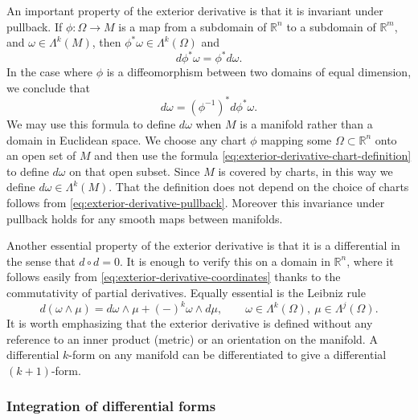{An important property of the exterior derivative is that it is invariant under pullback. If $\phi:\Omega\to M$ is a map from a subdomain of $\mathbb R^n$ to a subdomain of $\mathbb R^m$, and $\omega\in\Lambda^k(M)$, then $\phi^*\omega\in\Lambda^k(\Omega)$ and}
\begin{equation}\label{eq:exterior-derivative-pullback}
d\phi^*\omega=\phi^*d\omega.
\end{equation}
{In the case where $\phi$ is a diffeomorphism between two domains of equal dimension, we conclude that}
\begin{equation}\label{eq:exterior-derivative-chart-definition}
d\omega=(\phi^{-1})^*d\phi^*\omega.
\end{equation}
{We may use this formula to define $d\omega$ when $M$ is a manifold rather than a domain in Euclidean space. We choose any chart $\phi$ mapping some $\Omega\subset\mathbb R^n$ onto an open set of $M$ and then use the formula \eqref{eq:exterior-derivative-chart-definition} to define $d\omega$ on that open subset. Since $M$ is covered by charts, in this way we define $d\omega\in\Lambda^k(M)$. That the definition does not depend on the choice of charts follows from \eqref{eq:exterior-derivative-pullback}. Moreover this invariance under pullback holds for any smooth maps between manifolds.}

{Another essential property of the exterior derivative is that it is a differential in the sense that $d\circ d=0$. It is enough to verify this on a domain in $\mathbb R^n$, where it follows easily from \eqref{eq:exterior-derivative-coordinates} thanks to the commutativity of partial derivatives. Equally essential is the Leibniz rule}
\begin{equation}\label{eq:exterior-leibniz-rule}
d(\omega\wedge\mu)=d\omega\wedge\mu+(-)^k\omega\wedge d\mu,\qquad\omega\in\Lambda^k(\Omega),\ \mu\in\Lambda^j(\Omega).
\end{equation}
{It is worth emphasizing that the exterior derivative is defined without any reference to an inner product (metric) or an orientation on the manifold. A differential $k$-form on any manifold can be differentiated to give a differential $(k+1)$-form.}

\subsubsection{{Integration of differential forms}}\label{subsec:differential-form-integration}

